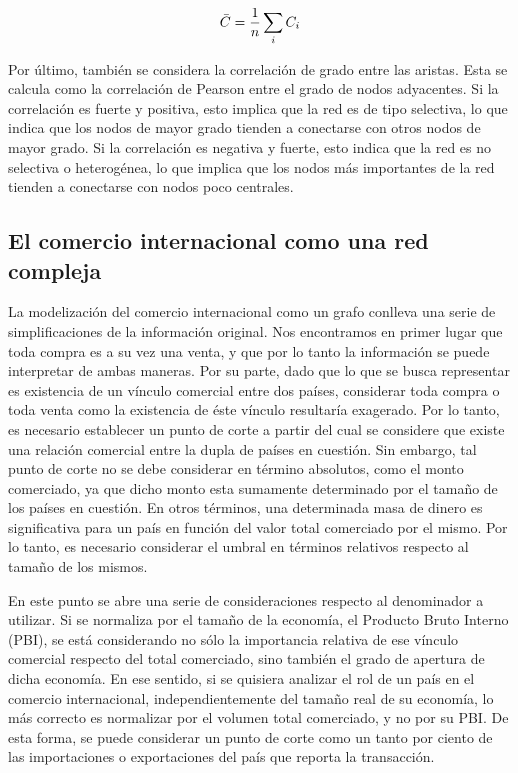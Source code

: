 \documentclass[class=article, crop=false]{standalone}
\begin{document}
$$
\Bar{C} = \frac{1}{n} \sum_{i} C_{i}
$$ 


Por último, también se considera la correlación de grado entre las aristas. Esta se calcula como la correlación de Pearson entre el grado de nodos adyacentes. Si la correlación es fuerte y positiva, esto implica que la red es de tipo selectiva, lo que indica que los nodos de mayor grado tienden a conectarse con otros nodos de mayor grado. Si la correlación es negativa y fuerte, esto indica que la red es no selectiva o heterogénea, lo que implica que los nodos más importantes de la red tienden a conectarse con nodos poco centrales. 


\subsection{El comercio internacional como una red compleja}

La modelización del comercio internacional como un grafo conlleva una serie de simplificaciones de la información original. Nos encontramos en primer lugar que toda compra es a su vez una venta, y que por lo tanto la información se puede interpretar de ambas maneras. Por su parte, dado que lo que se busca representar es existencia de un vínculo comercial entre dos países, considerar toda compra o toda venta como la existencia de éste vínculo resultaría exagerado. Por lo tanto, es necesario establecer un punto de corte a partir del cual se considere que existe una relación comercial entre la dupla de países en cuestión. Sin embargo, tal punto de corte no se debe considerar en término absolutos, como el monto comerciado, ya que dicho monto esta sumamente determinado por el tamaño de los países en cuestión. En otros términos, una determinada masa de dinero es significativa para un país en función del valor total comerciado por el mismo. Por lo tanto, es necesario considerar el umbral en términos relativos respecto al tamaño de los mismos.

En este punto se abre una serie de consideraciones respecto al denominador a utilizar. Si se normaliza por el tamaño de la economía, el Producto Bruto Interno (PBI), se está considerando no sólo la importancia relativa de ese vínculo comercial respecto del total comerciado, sino también el grado de apertura de dicha economía. En ese sentido, si se quisiera analizar el rol de un país en el comercio internacional, independientemente del tamaño real de su economía, lo más correcto es normalizar por el volumen total comerciado, y no por su PBI. De esta forma, se puede considerar un punto de corte como un tanto por ciento de las importaciones o exportaciones del país que reporta la transacción.
\end{document}

